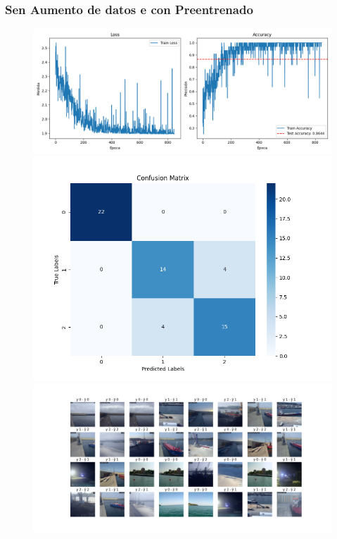\documentclass{article}
\begin{document}
\subsubsection{Sen Aumento de datos e con Preentrenado}
\begin{figure}[H]
    \centering
    \begin{minipage}{0.55\textwidth}
        \centering
        \includegraphics[width=\linewidth]{../ultimas_figuras/LOSS__A_False_P_True_D_True_MLP_True_efficientnet_b4.png}
    \end{minipage}
    \begin{minipage}{0.3\textwidth}
        \centering
        \includegraphics[width=\linewidth]{../ultimas_figuras/CM__A_False_P_True_D_True_MLP_True_efficientnet_b4.png}
    \end{minipage}
    \begin{minipage}{0.7\textwidth}
        \centering
        \includegraphics[width=\linewidth]{../ultimas_figuras/GRID__A_False_P_True_D_True_MLP_True_efficientnet_b4.png}
    \end{minipage}
\end{figure}
\end{document}
